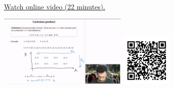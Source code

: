 
\begin{minipage}{10cm}
    \href{https://act4e-spring21.netlify.app/videos/spring2021-products:products:cat-prod:example-prod.html}{Watch online video (22 minutes).}
        
    \href{https://act4e-spring21.netlify.app/videos/spring2021-products:products:cat-prod:example-prod.html}{\includegraphics[height=3.5cm]{spring2021-products:products:cat-prod:example-prod/thumbnails.jpg}}
    \href{https://act4e-spring21.netlify.app/videos/spring2021-products:products:cat-prod:example-prod.html}{\includegraphics[height=2.5cm]{spring2021-products:products:cat-prod:example-prod/qrcode.png}}
\end{minipage}
